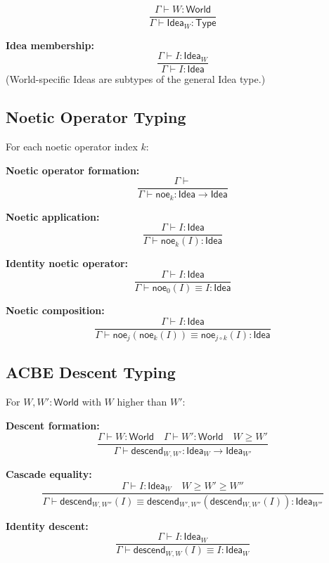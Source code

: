 \begin{definition}
\label{def:world-idea-formation}
\[
  \frac{\Gamma \vdash W : \mathsf{World}}
       {\Gamma \vdash \mathsf{Idea}_W : \mathsf{Type}}
  \tag{Idea-Form}
\]

\textbf{Idea membership:}
\[
  \frac{\Gamma \vdash I : \mathsf{Idea}_W}
       {\Gamma \vdash I : \mathsf{Idea}}
  \tag{Idea-Sub}
\]
(World-specific Ideas are subtypes of the general Idea type.)
\end{definition}

\subsection{Noetic Operator Typing}
\label{subsec:noetic-operator-typing}

\begin{definition}
\label{def:noetic-operator-rules}
For each noetic operator index $k$:

\textbf{Noetic operator formation:}
\[
  \frac{\Gamma \vdash}
       {\Gamma \vdash \mathsf{noe}_k : \mathsf{Idea} \to \mathsf{Idea}}
  \tag{Noe-Form}
\]

\textbf{Noetic application:}
\[
  \frac{\Gamma \vdash I : \mathsf{Idea}}
       {\Gamma \vdash \mathsf{noe}_k(I) : \mathsf{Idea}}
  \tag{Noe-App}
\]

\textbf{Identity noetic operator:}
\[
  \frac{\Gamma \vdash I : \mathsf{Idea}}
       {\Gamma \vdash \mathsf{noe}_0(I) \equiv I : \mathsf{Idea}}
  \tag{Noe-Id}
\]

\textbf{Noetic composition:}
\[
  \frac{\Gamma \vdash I : \mathsf{Idea}}
       {\Gamma \vdash \mathsf{noe}_j(\mathsf{noe}_k(I)) \equiv \mathsf{noe}_{j \circ k}(I) : \mathsf{Idea}}
  \tag{Noe-Comp}
\]
\end{definition}

\subsection{ACBE Descent Typing}
\label{subsec:acbe-descent-typing}

\begin{definition}
\label{def:acbe-descent-rules}
For $W, W' : \mathsf{World}$ with $W$ higher than $W'$:

\textbf{Descent formation:}
\[
  \frac{\Gamma \vdash W : \mathsf{World} \quad \Gamma \vdash W' : \mathsf{World} \quad W \geq W'}
       {\Gamma \vdash \mathsf{descend}_{W,W'} : \mathsf{Idea}_W \to \mathsf{Idea}_{W'}}
  \tag{Desc-Form}
\]

\textbf{Cascade equality:}
\[
  \frac{\Gamma \vdash I : \mathsf{Idea}_W \quad W \geq W' \geq W''}
       {\Gamma \vdash \mathsf{descend}_{W,W''}(I) \equiv \mathsf{descend}_{W',W''}(\mathsf{descend}_{W,W'}(I)) : \mathsf{Idea}_{W''}}
  \tag{Desc-Cascade}
\]

\textbf{Identity descent:}
\[
  \frac{\Gamma \vdash I : \mathsf{Idea}_W}
       {\Gamma \vdash \mathsf{descend}_{W,W}(I) \equiv I : \mathsf{Idea}_W}
  \tag{Desc-Id}
\]
\end{definition}

